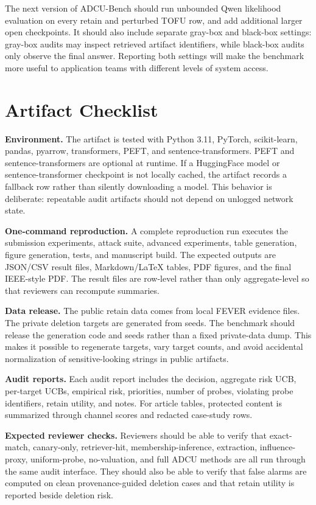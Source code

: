 \documentclass[10pt,journal,compsoc]{IEEEtran}
\newcommand{\method}{ADCU}
\newcommand{\bench}{ADCU-Bench}
\begin{document}
The next version of \bench{} should run unbounded Qwen likelihood evaluation on every retain and perturbed TOFU row, and add additional larger open checkpoints. It should also include separate gray-box and black-box settings: gray-box audits may inspect retrieved artifact identifiers, while black-box audits only observe the final answer. Reporting both settings will make the benchmark more useful to application teams with different levels of system access.

\section{Artifact Checklist}

\textbf{Environment.}
The artifact is tested with Python 3.11, PyTorch, scikit-learn, pandas, pyarrow, transformers, PEFT, and sentence-transformers. PEFT and sentence-transformers are optional at runtime. If a HuggingFace model or sentence-transformer checkpoint is not locally cached, the artifact records a fallback row rather than silently downloading a model. This behavior is deliberate: repeatable audit artifacts should not depend on unlogged network state.

\textbf{One-command reproduction.}
A complete reproduction run executes the submission experiments, attack suite, advanced experiments, table generation, figure generation, tests, and manuscript build. The expected outputs are JSON/CSV result files, Markdown/LaTeX tables, PDF figures, and the final IEEE-style PDF. The result files are row-level rather than only aggregate-level so that reviewers can recompute summaries.

\textbf{Data release.}
The public retain data comes from local FEVER evidence files. The private deletion targets are generated from seeds. The benchmark should release the generation code and seeds rather than a fixed private-data dump. This makes it possible to regenerate targets, vary target counts, and avoid accidental normalization of sensitive-looking strings in public artifacts.

\textbf{Audit reports.}
Each audit report includes the decision, aggregate risk UCB, per-target UCBs, empirical risk, priorities, number of probes, violating probe identifiers, retain utility, and notes. For article tables, protected content is summarized through channel scores and redacted case-study rows.

\textbf{Expected reviewer checks.}
Reviewers should be able to verify that exact-match, canary-only, retriever-hit, membership-inference, extraction, influence-proxy, uniform-probe, no-valuation, and full \method{} methods are all run through the same audit interface. They should also be able to verify that false alarms are computed on clean provenance-guided deletion cases and that retain utility is reported beside deletion risk.
\end{document}
